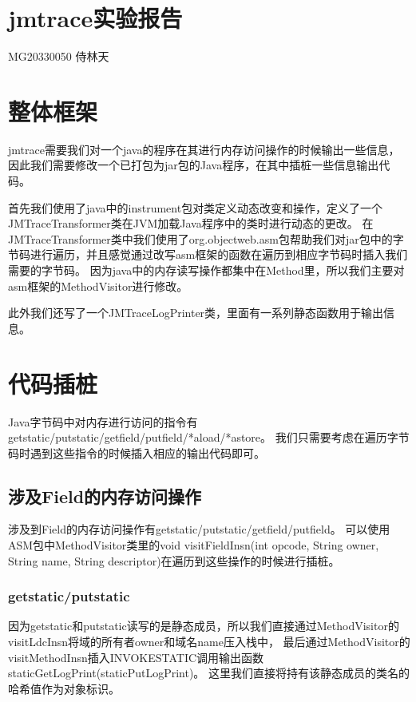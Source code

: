 \documentclass[UTF8]{article}
\begin{document}
\section*{jmtrace实验报告}
MG20330050 侍林天
\section{整体框架}
jmtrace需要我们对一个java的程序在其进行内存访问操作的时候输出一些信息，因此我们需要修改一个已打包为jar包的Java程序，在其中插桩一些信息输出代码。

首先我们使用了java中的instrument包对类定义动态改变和操作，定义了一个JMTraceTransformer类在JVM加载Java程序中的类时进行动态的更改。
在JMTraceTransformer类中我们使用了org.objectweb.asm包帮助我们对jar包中的字节码进行遍历，并且感觉通过改写asm框架的函数在遍历到相应字节码时插入我们需要的字节码。
因为java中的内存读写操作都集中在Method里，所以我们主要对asm框架的MethodVisitor进行修改。

此外我们还写了一个JMTraceLogPrinter类，里面有一系列静态函数用于输出信息。

\section{代码插桩}
Java字节码中对内存进行访问的指令有getstatic/putstatic/getfield/putfield/*aload/*astore。
我们只需要考虑在遍历字节码时遇到这些指令的时候插入相应的输出代码即可。

\subsection{涉及Field的内存访问操作}
涉及到Field的内存访问操作有getstatic/putstatic/getfield/putfield。
可以使用ASM包中MethodVisitor类里的void visitFieldInsn(int opcode, String owner, String name, String descriptor)在遍历到这些操作的时候进行插桩。

\subsubsection{getstatic/putstatic}
因为getstatic和putstatic读写的是静态成员，所以我们直接通过MethodVisitor的visitLdcInsn将域的所有者owner和域名name压入栈中，
最后通过MethodVisitor的visitMethodInsn插入INVOKESTATIC调用输出函数staticGetLogPrint(staticPutLogPrint)。
这里我们直接将持有该静态成员的类名的哈希值作为对象标识。
\end{document}
